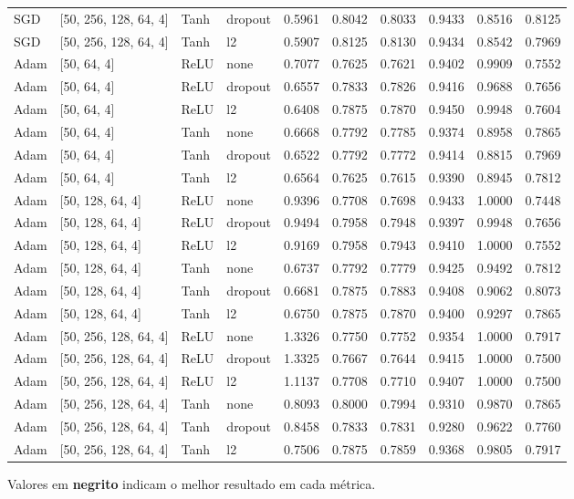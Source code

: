 \documentclass[12pt,a4paper]{article}
\begin{document}
\begin{table}[h]
\begin{tabular}{llllllllll}
SGD & [50, 256, 128, 64, 4] & Tanh & dropout & 0.5961 & 0.8042 & 0.8033 & 0.9433 & 0.8516 & 0.8125 \\
SGD & [50, 256, 128, 64, 4] & Tanh & l2 & 0.5907 & 0.8125 & 0.8130 & 0.9434 & 0.8542 & 0.7969 \\
Adam & [50, 64, 4] & ReLU & none & 0.7077 & 0.7625 & 0.7621 & 0.9402 & 0.9909 & 0.7552 \\
Adam & [50, 64, 4] & ReLU & dropout & 0.6557 & 0.7833 & 0.7826 & 0.9416 & 0.9688 & 0.7656 \\
Adam & [50, 64, 4] & ReLU & l2 & 0.6408 & 0.7875 & 0.7870 & 0.9450 & 0.9948 & 0.7604 \\
Adam & [50, 64, 4] & Tanh & none & 0.6668 & 0.7792 & 0.7785 & 0.9374 & 0.8958 & 0.7865 \\
Adam & [50, 64, 4] & Tanh & dropout & 0.6522 & 0.7792 & 0.7772 & 0.9414 & 0.8815 & 0.7969 \\
Adam & [50, 64, 4] & Tanh & l2 & 0.6564 & 0.7625 & 0.7615 & 0.9390 & 0.8945 & 0.7812 \\
Adam & [50, 128, 64, 4] & ReLU & none & 0.9396 & 0.7708 & 0.7698 & 0.9433 & 1.0000 & 0.7448 \\
Adam & [50, 128, 64, 4] & ReLU & dropout & 0.9494 & 0.7958 & 0.7948 & 0.9397 & 0.9948 & 0.7656 \\
Adam & [50, 128, 64, 4] & ReLU & l2 & 0.9169 & 0.7958 & 0.7943 & 0.9410 & 1.0000 & 0.7552 \\
Adam & [50, 128, 64, 4] & Tanh & none & 0.6737 & 0.7792 & 0.7779 & 0.9425 & 0.9492 & 0.7812 \\
Adam & [50, 128, 64, 4] & Tanh & dropout & 0.6681 & 0.7875 & 0.7883 & 0.9408 & 0.9062 & 0.8073 \\
Adam & [50, 128, 64, 4] & Tanh & l2 & 0.6750 & 0.7875 & 0.7870 & 0.9400 & 0.9297 & 0.7865 \\
Adam & [50, 256, 128, 64, 4] & ReLU & none & 1.3326 & 0.7750 & 0.7752 & 0.9354 & 1.0000 & 0.7917 \\
Adam & [50, 256, 128, 64, 4] & ReLU & dropout & 1.3325 & 0.7667 & 0.7644 & 0.9415 & 1.0000 & 0.7500 \\
Adam & [50, 256, 128, 64, 4] & ReLU & l2 & 1.1137 & 0.7708 & 0.7710 & 0.9407 & 1.0000 & 0.7500 \\
Adam & [50, 256, 128, 64, 4] & Tanh & none & 0.8093 & 0.8000 & 0.7994 & 0.9310 & 0.9870 & 0.7865 \\
Adam & [50, 256, 128, 64, 4] & Tanh & dropout & 0.8458 & 0.7833 & 0.7831 & 0.9280 & 0.9622 & 0.7760 \\
Adam & [50, 256, 128, 64, 4] & Tanh & l2 & 0.7506 & 0.7875 & 0.7859 & 0.9368 & 0.9805 & 0.7917 \\
\bottomrule
\end{tabular}
\begin{tablenotes}
  \footnotesize
  \item Valores em \textbf{negrito} indicam o melhor resultado em cada métrica.
\end{tablenotes}
\end{table}
\end{document}
